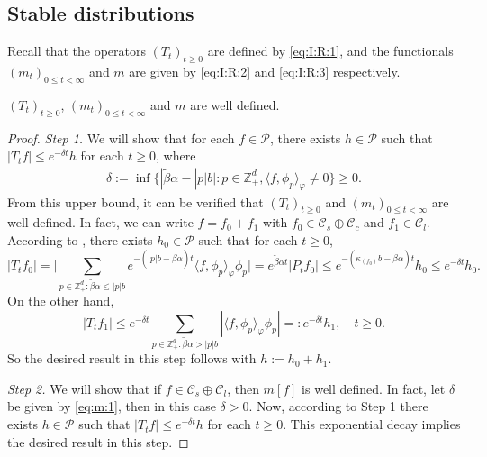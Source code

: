 \documentclass[EJP]{ejpecp} %
\begin{document}
\subsection{Stable distributions}
\label{sec: stable distributions}
Recall that the operators $(T_t)_{t\geq 0}$ are defined by \eqref{eq:I:R:1}, and the functionals $(m_{t})_{0\leq t< \infty}$ and $m$ are given by \eqref{eq:I:R:2} and \eqref{eq:I:R:3} respectively.
\begin{lemma}
  \label{lem:m}
$(T_t)_{t\geq 0}$,  $(m_{t})_{0\leq t< \infty}$ and  $m$ are well defined.
\end{lemma}
\begin{proof}
  \emph{Step 1.} We will show that for each $f \in \mathcal P$, there exists $h \in \mathcal P$ such that $ |T_tf| \leq  e^{- \delta t} h$ for each $t\geq 0$, where
  \begin{align}
    \label{eq:m:1}
    \delta
    := \inf \big\{ |\tilde \beta \alpha - |p|b| : p \in \mathbb Z_+^d, \langle f, \phi_p\rangle_\varphi \neq 0 \big\}
    \geq 0.
  \end{align}
  From this upper bound, it can be verified that $(T_t)_{t\geq 0}$ and $(m_{t})_{0 \leq t < \infty}$ are well defined.
  In fact, we can write $f = f_0 + f_1$ with $f_0\in \mathcal C_s \oplus \mathcal C_c$ and $f_1 \in \mathcal C_l$.
  According to \cite[Lemma 2.7]{MarksMilos2018CLT}, there exists $h_0 \in \mathcal P$ such that for each $t\geq 0$,
  \[
    |T_t f_0|
    = \Big| \sum_{p \in  \mathbb Z_+^d: \tilde \beta \alpha \leq |p|b } e^{- ( |p| b - \tilde \beta \alpha ) t} \langle f, \phi_p \rangle_\varphi \phi_p \Big|
    = e^{\tilde \beta \alpha t} | P_t f_0 |
    \leq e^{- ( \kappa_{(f_0)} b - \tilde \beta \alpha) t} h_0
    \leq e^{- \delta t} h_0.
  \]
  On the other hand,
  \[
    |T_t f_1|
    \leq e^{- \delta t}\sum_{p \in \mathbb Z_+^d : \tilde \beta \alpha > |p|b} |\langle f, \phi_p \rangle_\varphi \phi_p|
    =: e^{- \delta t} h_1,
    \quad t\geq 0.
  \]
  So the desired result in this step follows with $h := h_0 + h_1$.

  \emph{Step 2.} We will show that if $f \in \mathcal C_s \oplus \mathcal C_l$, then $m[f]$ is well defined.
  In fact, let $\delta$ be given by \eqref{eq:m:1}, then in this case $\delta > 0$.
  Now, according to Step 1 there exists $h \in \mathcal P$ such that $|T_tf| \leq e^{- \delta t} h$ for each $t\geq 0$.
  This exponential decay implies the desired result in this step.


\end{proof}
\end{document}
